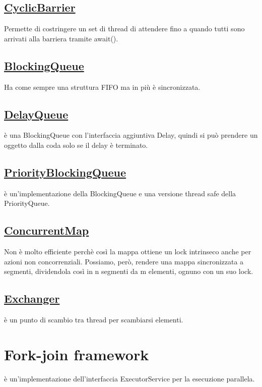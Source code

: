 \documentclass[11pt,a4paper]{book}
\begin{document}
\section{\href{https://docs.oracle.com/javase/7/docs/api/java/util/concurrent/CyclicBarrier.html}{CyclicBarrier}}
Permette di costringere un set di thread di attendere fino a quando tutti sono arrivati alla barriera tramite await().
\section{\href{https://docs.oracle.com/javase/7/docs/api/java/util/concurrent/BlockingQueue.html}{BlockingQueue}}
Ha come sempre una struttura FIFO ma in più è sincronizzata.
\section{\href{https://docs.oracle.com/javase/7/docs/api/java/util/concurrent/DelayQueue.html}{DelayQueue}}
è una BlockingQueue con l'interfaccia aggiuntiva Delay, quindi si può prendere un oggetto dalla coda solo se il delay è terminato.
\section{\href{https://docs.oracle.com/javase/7/docs/api/java/util/concurrent/PriorityBlockingQueue.html}{PriorityBlockingQueue}}
è un'implementazione della BlockingQueue e una versione thread safe della PriorityQueue. 
\section{\href{https://docs.oracle.com/javase/8/docs/api/java/util/concurrent/ConcurrentMap.html}{ConcurrentMap}}
Non è molto efficiente perchè così la mappa ottiene un lock intrinseco anche per azioni non concorrenziali. Possiamo, però, rendere una mappa sincronizzata a segmenti, dividendola così in n segmenti da m elementi, ognuno con un suo lock.
\section{\href{https://docs.oracle.com/javase/7/docs/api/java/util/concurrent/Exchanger.html}{Exchanger}}
è un punto di scambio tra thread per scambiarsi elementi.

\chapter{Fork-join framework}
è un'implementazione dell'interfaccia ExecutorService per la esecuzione parallela.
\end{document}
